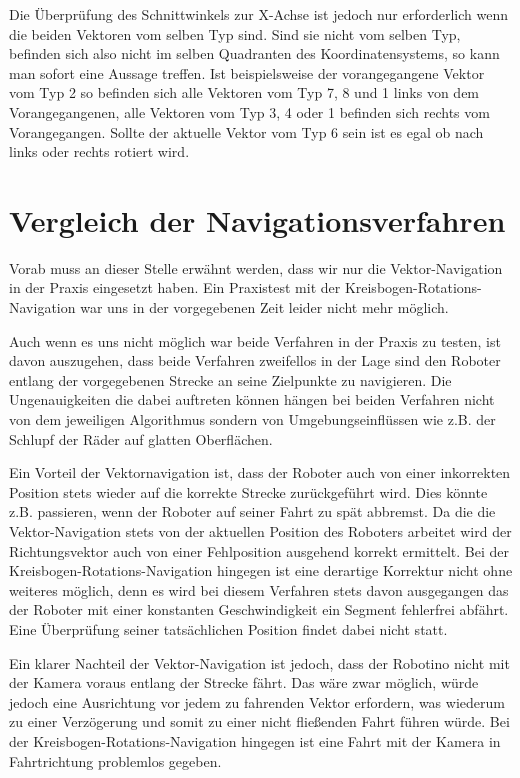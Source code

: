 
Die Überprüfung des Schnittwinkels zur X-Achse ist jedoch nur erforderlich wenn
die beiden Vektoren vom selben Typ sind. Sind sie nicht vom selben Typ, befinden
sich also nicht im selben Quadranten des Koordinatensystems, so kann man sofort
eine Aussage treffen. Ist beispielsweise der vorangegangene Vektor vom Typ 2 so
befinden sich alle Vektoren vom Typ 7, 8 und 1 links von dem Vorangegangenen,
alle Vektoren vom Typ 3, 4 oder 1 befinden sich rechts vom Vorangegangen. Sollte
der aktuelle Vektor vom Typ 6 sein ist es egal ob nach links oder rechts rotiert
wird.



\section{Vergleich der Navigationsverfahren}

Vorab muss an dieser Stelle erwähnt werden, dass wir nur die Vektor-Navigation
in der Praxis eingesetzt haben. Ein Praxistest mit der
Kreisbogen-Rotations-Navigation war uns in der vorgegebenen Zeit leider nicht
mehr möglich.

Auch wenn es uns nicht möglich war beide Verfahren in der Praxis zu testen, ist
davon auszugehen, dass beide Verfahren zweifellos in der Lage sind den Roboter
entlang der vorgegebenen Strecke an seine Zielpunkte zu navigieren. Die
Ungenauigkeiten die dabei auftreten können hängen bei beiden Verfahren nicht von
dem jeweiligen Algorithmus sondern von Umgebungseinflüssen wie z.B. der Schlupf
der Räder auf glatten Oberflächen.

Ein Vorteil der Vektornavigation ist, dass der Roboter auch von einer
inkorrekten Position stets wieder auf die korrekte Strecke zurückgeführt wird.
Dies könnte z.B. passieren, wenn der Roboter auf seiner Fahrt zu spät abbremst.
Da die die Vektor-Navigation stets von der aktuellen Position des Roboters
arbeitet wird der Richtungsvektor auch von einer Fehlposition ausgehend korrekt
ermittelt. Bei der Kreisbogen-Rotations-Navigation hingegen ist eine derartige
Korrektur nicht ohne weiteres möglich, denn es wird bei diesem Verfahren stets
davon ausgegangen das der Roboter mit einer konstanten Geschwindigkeit ein
Segment fehlerfrei abfährt. Eine Überprüfung seiner tatsächlichen Position
findet dabei nicht statt.

Ein klarer Nachteil der Vektor-Navigation ist jedoch, dass der Robotino nicht
mit der Kamera voraus entlang der Strecke fährt. Das wäre zwar möglich, würde
jedoch eine Ausrichtung vor jedem zu fahrenden Vektor erfordern, was wiederum zu
einer Verzögerung und somit zu einer nicht fließenden Fahrt führen würde. Bei
der Kreisbogen-Rotations-Navigation hingegen ist eine Fahrt mit der Kamera in
Fahrtrichtung problemlos gegeben.

